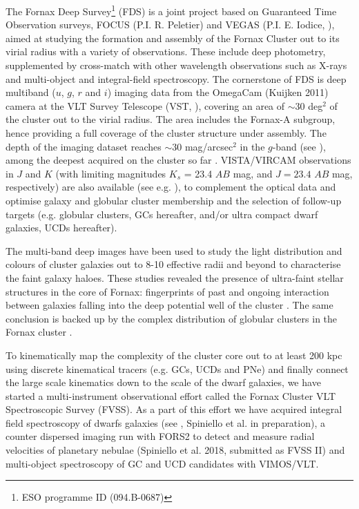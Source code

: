 \documentclass[useAMS,usenatbib]{mn2e}
\begin{document}
The Fornax Deep Survey\footnote{ESO programme ID (094.B-0687)} (FDS) is a joint 
project based on Guaranteed Time Observation surveys, FOCUS (P.I. R. Peletier) 
and VEGAS (P.I. E. Iodice, \citealt{capaccioli+15}), aimed at studying the 
formation and assembly of the Fornax Cluster out to its virial radius with a 
variety of observations. These include
deep photometry, supplemented by cross-match with other wavelength observations 
such as  X-rays \citep[][e.g.,]{Paolillo02} and multi-object and integral-field 
spectroscopy.
The cornerstone of FDS is deep multiband ($u$, $g$, $r$ and $i$) imaging data 
from the OmegaCam (Kuijken 2011) camera at the VLT Survey Telescope (VST, 
\citealt{schipani+12}), covering an area of $\sim30$ deg$^2$ of the cluster out 
to the virial radius. The area includes the Fornax-A subgroup, hence providing 
a full coverage of the cluster structure under assembly.  The depth of the 
imaging dataset reaches $\sim 30$ mag/arcsec$^2$ in the $g$-band (see \citealt{Iodice16,iodice17}
), among the deepest acquired on the cluster so far \citep{venhola+17}. 
VISTA/VIRCAM observations in $J$ and $K$ (with limiting magnitudes $K_s$ = 23.4 $AB$ mag, and 
$J = 23.4$ $AB$ mag, respectively) are also available (see e.g. \citealt{munoz+15}), to 
complement the optical data and optimise galaxy and globular cluster membership 
and the selection of follow-up targets (e.g. globular clusters, GCs hereafter, 
and/or ultra compact dwarf galaxies, UCDs hereafter). 

The multi-band deep images have been used to study the light distribution and 
colours of cluster galaxies out to 8-10 effective radii and beyond to 
characterise the faint galaxy haloes. These studies revealed the presence of 
ultra-faint stellar structures in the core of Fornax: fingerprints of past and 
ongoing interaction between galaxies falling into the deep potential well of 
the cluster \citep{Iodice16,venhola+17}. The same conclusion is 
backed up by the complex distribution of globular clusters in the Fornax 
cluster \citep{DAbrusco16,cantiello+17}.

To kinematically map the complexity of the cluster core out to at least 200 kpc 
using discrete kinematical tracers (e.g. GCs, UCDs and PNe) and finally connect the 
large scale kinematics down to the scale of the dwarf galaxies, we have started 
a multi-instrument observational effort called the Fornax Cluster VLT 
Spectroscopic Survey (FVSS). As a part of this effort we have acquired integral 
field spectroscopy of dwarfs galaxies (see \citealt{mentz+16}, Spiniello et al. 
in preparation), a counter dispersed imaging run with FORS2 to detect and 
measure radial velocities of planetary nebulae (Spiniello et al. 2018, 
submitted as FVSS II) and multi-object spectroscopy of GC and UCD candidates 
with VIMOS/VLT.
\end{document}
